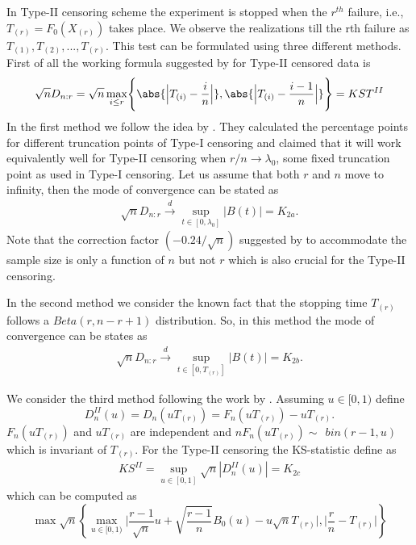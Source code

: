 \documentclass[12pt, reqno]{amsart}
\begin{document}
 In Type-II censoring scheme the experiment is stopped when the $r^{th}$ failure, i.e., $T_{(r)} =
F_{0}(X_{(r)})$ takes place. We observe the realizations till the rth failure as ${T_{(1)},T_{(2)}, . . . , T_{(r)}}$. This test can be formulated using  three different methods. First of all the working formula suggested by \cite{Dufour_1978}  for Type-II censored data is 
\begin{equation}
{\displaystyle {\sqrt {n}}D_{n:r}}={\displaystyle{\sqrt{n}}\max_{i\leq r}} \displaystyle { \Bigg\{ { \abs{ \Big| T_{(i)} - \frac{i}{n} \Big|}, \abs{ \Big|T_{(i)} - \frac{i-1}{n} \Big| } \Bigg\} = KST^{II} } } 
\label{kst2}
\end{equation}
In the first method we follow the idea by \cite{Koziol}. They calculated the percentage points for different truncation points of 
Type-I censoring and claimed that it will work equivalently well for Type-II censoring when $r/n\longrightarrow \lambda_0$, some fixed truncation point as used in Type-I censoring.  
Let us assume that both $r$ and $n$ move to infinity, then   the mode of convergence can be stated as 
\begin{align}
     {{\sqrt {n}}D_{n:r}}  \xrightarrow{d} {\displaystyle \sup _{t\in [0,\lambda_{0}]}|B(t)|=K_{2a} .} 
\end{align}
Note that the correction factor $(-0.24/\sqrt{n})$  suggested by \cite{Koziol}  to accommodate the sample size  is only a function of $n$ but not $r$ which is also crucial for the Type-II censoring.

 In the second method we consider the known fact that the stopping time $T_{(r)}$ follows a $Beta(r, n - r + 1)$ distribution. 
 So, in this method the mode of convergence can be states as 
\begin{align}
     {{\sqrt {n}}D_{n:r}}  \xrightarrow{d} {\displaystyle \sup _{t\in [0,T_{(r)}]}|B(t)|=K_{2b}  .} 
\end{align}

We consider the third method following the work by \cite{Banerjee_B.}. Assuming  $u\in[0,1)$  define 
  \begin{equation}
  D_n^{II}(u)=D_n(uT_{(r)})=F_n(uT_{(r)})-uT_{(r)}.
 \end{equation}
  $F_n(uT_{(r)})$ and $uT_{(r)}$ are independent and $nF_n(uT_{(r)})\sim ~~bin(r-1,u)$ which is invariant of $T_{(r)}$. For  the Type-II censoring
  the KS-statistic define as 
  \begin{align}
       \displaystyle KS^{II}= \sup_{u\in[0,1]}\sqrt{n}|D_{n}^{II}(u)|=K_{2c}
  \end{align}
which can be computed as 
\begin{equation}
\max \sqrt{n}   \left\{{ \displaystyle{ \max_{u\in[0,1)} \Bigg| \frac{r-1}{\sqrt{n}} u + \sqrt{\frac{r-1}{n}} B_0(u)-u\sqrt{n} T_{(r)} \Bigg|, \Bigg| \frac{r}{n}- T_{(r)} \Bigg|  }}\right\}
\end{equation}
\end{document}
